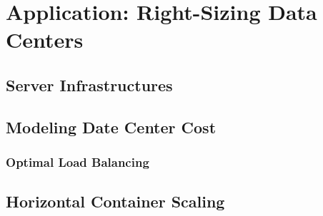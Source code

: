 
\chapter{Application: Right-Sizing Data Centers}\label{chapter:application_data_centers}

\section{Server Infrastructures}

\section{Modeling Date Center Cost}

\subsection{Optimal Load Balancing}

\section{Horizontal Container Scaling}
